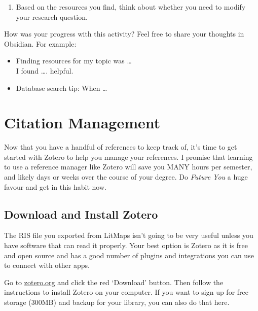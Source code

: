 \documentclass[
]{book}
\providecommand{\tightlist}{%
  \setlength{\itemsep}{0pt}\setlength{\parskip}{0pt}}
\theoremstyle{definition}
\theoremstyle{definition}
\theoremstyle{definition}
\theoremstyle{definition}
\theoremstyle{remark}
\begin{document}
\begin{reflect}
\begin{enumerate}
\def\labelenumi{\arabic{enumi}.}
\setcounter{enumi}{3}
\tightlist
\item
  Based on the resources you find, think about whether you need to modify your research question.
\end{enumerate}

How was your progress with this activity? Feel free to share your thoughts in Obsidian. For example:

\begin{itemize}
\tightlist
\item
  Finding resources for my topic was \ldots{}\\
  I found \ldots. helpful.\\
\item
  Database search tip: When \ldots{}
\end{itemize}
\end{reflect}

\hypertarget{citation-management}{%
\section{Citation Management}\label{citation-management}}

Now that you have a handful of references to keep track of, it's time to get started with Zotero to help you manage your references. I promise that learning to use a reference manager like Zotero will save you MANY hours per semester, and likely days or weeks over the course of your degree. Do \emph{Future You} a huge favour and get in this habit now.

\hypertarget{download-and-install-zotero}{%
\subsection*{Download and Install Zotero}\label{download-and-install-zotero}}

The RIS file you exported from LitMaps isn't going to be very useful unless you have software that can read it properly. Your best option is Zotero as it is free and open source and has a good number of plugins and integrations you can use to connect with other apps.

Go to \href{https://zotero.org}{zotero.org} and click the red `Download' button. Then follow the instructions to install Zotero on your computer. If you want to sign up for free storage (300MB) and backup for your library, you can also do that here.
\end{document}
